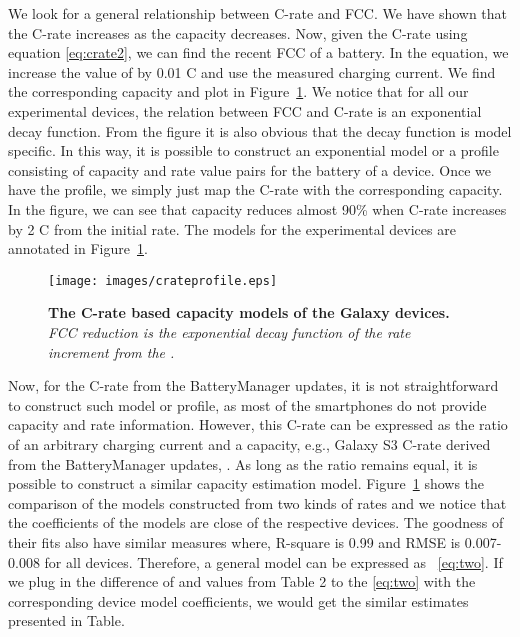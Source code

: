 \documentclass[journal]{IEEEtran}
\begin{document}
We look for a general relationship between C-rate and FCC. We have shown that the C-rate increases as the capacity decreases. Now, given the C-rate using equation \eqref{eq:crate2}, we can find the recent FCC of a battery. In the equation, we increase the value of  by 0.01 C and use the measured charging current. We  find the corresponding capacity and plot in Figure~\ref{fig:crate_profiles}. We notice that for all our experimental devices, the relation between FCC and C-rate is an exponential decay function. From the figure it is also obvious that the decay function is model specific. In this way, it is possible to construct an exponential model or a profile consisting of capacity and rate value pairs for the battery of a device. Once we have the profile, we simply just map the C-rate with the corresponding capacity. In the figure, we can see that capacity reduces almost 90\% when  C-rate increases by 2 C from the initial rate. The models for the experimental devices are annotated in Figure~\ref{fig:crate_profiles}.

\begin{figure}[t]
  \begin{center}
\texttt{[image: images/crateprofile.eps]}
    
\caption{{\bf The C-rate based capacity models of the Galaxy devices. } {\sl FCC reduction is the exponential decay function of the rate increment from the .}}
    \vspace{-5mm}
    \label{fig:crate_profiles}
 \end{center}
 \end{figure}






Now, for the C-rate from the BatteryManager updates, it is not straightforward to construct such model or profile, as most of the smartphones do not provide capacity and rate  information. However, this C-rate can be expressed as the ratio of an arbitrary charging current and a capacity, e.g., Galaxy S3 C-rate derived from the BatteryManager updates, . As long as the ratio remains equal, it is possible to construct a similar capacity estimation model. Figure~\ref{fig:crate_profiles} shows  the comparison of the models constructed from two kinds of rates and we notice that the coefficients of the models are close of the respective devices. The goodness of their fits also have similar measures where,  R-square is 0.99 and RMSE is 0.007-0.008 for all devices. Therefore, a general model can be expressed as ~\eqref{eq:two}. If we plug in the difference of  and  values from Table 2 to the \eqref{eq:two} with the corresponding device model coefficients, we would get the similar estimates presented in Table.
\end{document}
